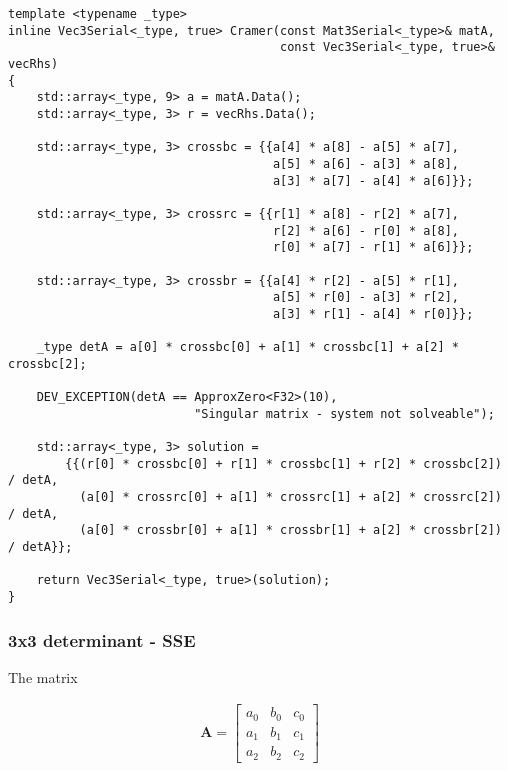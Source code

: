 \begin{verbatim}
template <typename _type>
inline Vec3Serial<_type, true> Cramer(const Mat3Serial<_type>& matA, 
                                      const Vec3Serial<_type, true>& vecRhs)
{
    std::array<_type, 9> a = matA.Data();
    std::array<_type, 3> r = vecRhs.Data();

    std::array<_type, 3> crossbc = {{a[4] * a[8] - a[5] * a[7], 
                                     a[5] * a[6] - a[3] * a[8], 
                                     a[3] * a[7] - a[4] * a[6]}};

    std::array<_type, 3> crossrc = {{r[1] * a[8] - r[2] * a[7], 
                                     r[2] * a[6] - r[0] * a[8], 
                                     r[0] * a[7] - r[1] * a[6]}};

    std::array<_type, 3> crossbr = {{a[4] * r[2] - a[5] * r[1], 
                                     a[5] * r[0] - a[3] * r[2], 
                                     a[3] * r[1] - a[4] * r[0]}};

    _type detA = a[0] * crossbc[0] + a[1] * crossbc[1] + a[2] * crossbc[2];

    DEV_EXCEPTION(detA == ApproxZero<F32>(10), 
                          "Singular matrix - system not solveable");

    std::array<_type, 3> solution = 
        {{(r[0] * crossbc[0] + r[1] * crossbc[1] + r[2] * crossbc[2]) / detA,
          (a[0] * crossrc[0] + a[1] * crossrc[1] + a[2] * crossrc[2]) / detA,
          (a[0] * crossbr[0] + a[1] * crossbr[1] + a[2] * crossbr[2]) / detA}};

    return Vec3Serial<_type, true>(solution);
}
\end{verbatim}


\newpage
\subsubsection{3x3 determinant - SSE}
\label{sec:determinant3x3SSE}

The matrix

\begin{align*}
\mathbf{A}
=
\begin{bmatrix}
a_0&b_0&c_0\\
a_1&b_1&c_1\\
a_2&b_2&c_2
\end{bmatrix}
\end{align*}

